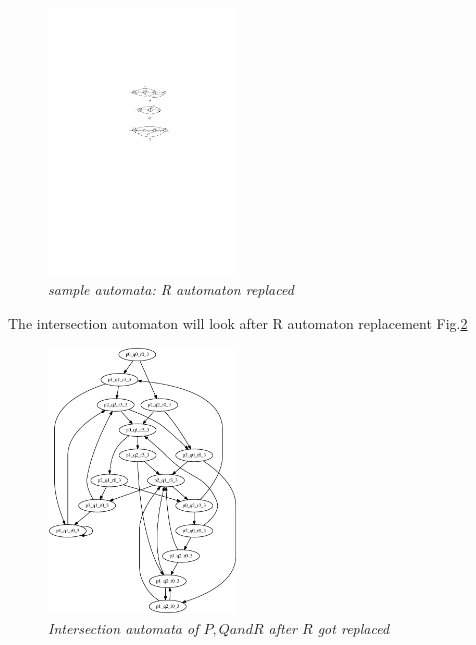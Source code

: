 \begin{figure}
\begin{center}
\includegraphics[width=50mm]{graph_after_r_replacement.pdf}
\end{center}
\caption{{\em sample automata: R automaton replaced}}
\label{automata_r_replaced}
\end{figure}


The intersection automaton will look after R automaton replacement Fig.\ref{graph_r_replaced}

  \begin{figure}
\begin{center}
\includegraphics[width=50mm]{graph_r_replaced.pdf}
\end{center}
\caption{{\em Intersection automata of $P, Q and R$ after $R$ got replaced}}
\label{graph_r_replaced}
\end{figure}